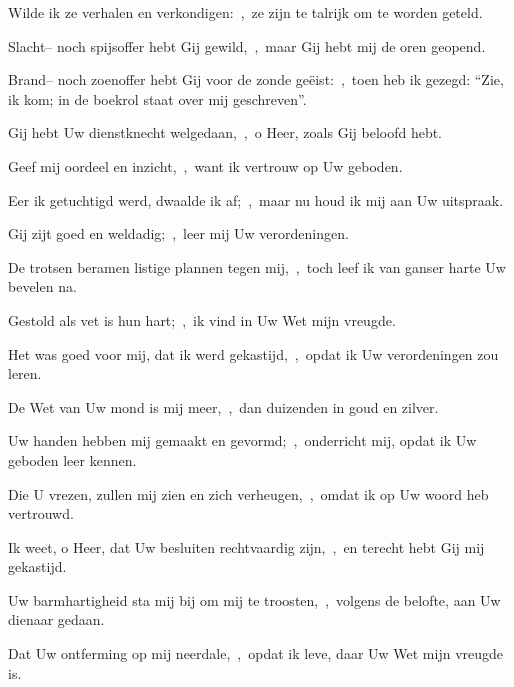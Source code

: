 \documentclass[12pt,twoside,a5paper]{article}
\begin{document}
\begin{halfparskip}
   

  Wilde ik ze verhalen en verkondigen:~\sep\ ze zijn te talrijk om te worden geteld.


  Slacht-- noch spijsoffer hebt Gij gewild,~\sep\ maar Gij hebt mij de oren geopend.

  Brand-- noch zoenoffer hebt Gij voor de zonde geëist:~\sep\ toen heb ik gezegd: ``Zie, ik kom; in de boekrol staat over mij geschreven''.
\end{halfparskip}

\begin{halfparskip}
   

  Gij hebt Uw dienstknecht welgedaan,~\sep\ o Heer, zoals Gij beloofd hebt.


  Geef mij oordeel en inzicht,~\sep\ want ik vertrouw op Uw geboden.

  Eer ik getuchtigd werd, dwaalde ik af;~\sep\ maar nu houd ik mij aan Uw uitspraak.

  Gij zijt goed en weldadig;~\sep\ leer mij Uw verordeningen.

  De trotsen beramen listige plannen tegen mij,~\sep\ toch leef ik van ganser harte Uw bevelen na.

  Gestold als vet is hun hart;~\sep\ ik vind in Uw Wet mijn vreugde.

  Het was goed voor mij, dat ik werd gekastijd,~\sep\ opdat ik Uw verordeningen zou leren.

  De Wet van Uw mond is mij meer,~\sep\ dan duizenden in goud en zilver.

  Uw handen hebben mij gemaakt en gevormd;~\sep\ onderricht mij, opdat ik Uw geboden leer kennen.

  Die U vrezen, zullen mij zien en zich verheugen,~\sep\ omdat ik op Uw woord heb vertrouwd.

  Ik weet, o Heer, dat Uw besluiten rechtvaardig zijn,~\sep\ en terecht hebt Gij mij gekastijd.

  Uw barmhartigheid sta mij bij om mij te troosten,~\sep\ volgens de belofte, aan Uw dienaar gedaan.

  Dat Uw ontferming op mij neerdale,~\sep\ opdat ik leve, daar Uw Wet mijn vreugde is.


\end{halfparskip}
\end{document}
